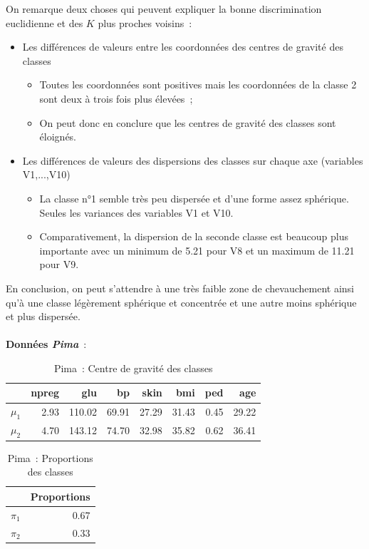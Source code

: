 \documentclass[a4paper,10pt]{report}
\begin{document}
On remarque deux choses qui peuvent expliquer la bonne discrimination euclidienne et des $K$ plus proches voisins~:
\begin{itemize}
	\item Les différences de valeurs entre les coordonnées des centres de gravité des classes
	\begin{itemize}
		\item Toutes les coordonnées sont positives mais les coordonnées de la classe 2 sont deux à trois fois plus élevées~;
		\item On peut donc en conclure que les centres de gravité des classes sont éloignés.
	\end{itemize}
	\item Les différences de valeurs des dispersions des classes sur chaque axe (variables V1,...,V10)
	\begin{itemize}
		\item La classe n°1 semble très peu dispersée et d'une forme assez sphérique. Seules les variances des variables V1 et V10.
		\item Comparativement, la dispersion de la seconde classe est beaucoup plus importante avec un minimum de 5.21 pour V8	et un maximum de 11.21 pour V9.
	\end{itemize}
\end{itemize}

En conclusion, on peut s'attendre à une très faible zone de chevauchement ainsi qu'à une classe légèrement sphérique et concentrée et une autre moins sphérique et plus dispersée.\\
~\\







\textbf{Données \textit{Pima}}~:

\begin{table}[H]
	\centering
	\begin{tabular}{r|rrrrrrr}
		& npreg & glu & bp & skin & bmi & ped & age \\ 
		\hline
		$\mu_{1}$  & 2.93 & 110.02 & 69.91 & 27.29 & 31.43 & 0.45 & 29.22 \\ 
		$\mu_{2}$  & 4.70 & 143.12 & 74.70 & 32.98 & 35.82 & 0.62 & 36.41 \\ 
	\end{tabular}
	\caption{Pima~: Centre de gravité des classes}
\end{table}

\begin{table}[H]
	\centering
	\begin{tabular}{rr}
		\hline
		& Proportions \\ 
		\hline
		$\pi_{1}$ & 0.67 \\ 
		$\pi_{2}$ & 0.33 \\ 
	\end{tabular}
	\caption{Pima~: Proportions des classes}
\end{table}
\end{document}
